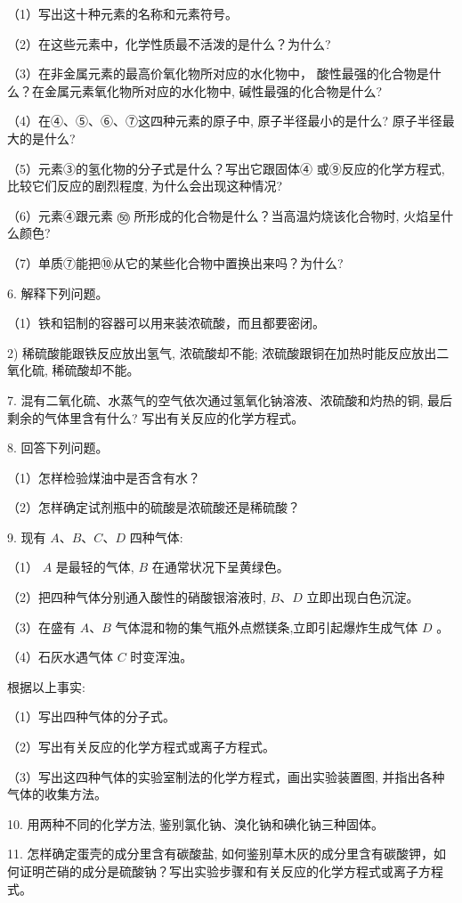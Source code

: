 \documentclass[10pt]{article}
\begin{document}
（1）写出这十种元素的名称和元素符号。

（2）在这些元素中，化学性质最不活泼的是什么？为什么?

（3）在非金属元素的最高价氧化物所对应的水化物中， 酸性最强的化合物是什么？在金属元素氧化物所对应的水化物中, 碱性最强的化合物是什么?

（4）在④、⑤、⑥、⑦这四种元素的原子中, 原子半径最小的是什么? 原子半径最大的是什么?

（5）元素③的氢化物的分子式是什么？写出它跟固体④ 或⑨反应的化学方程式, 比较它们反应的剧烈程度, 为什么会出现这种情况?

（6）元素④跟元素 \(\text{㊿}\) 所形成的化合物是什么？当高温灼烧该化合物时, 火焰呈什么颜色?

（7）单质⑦能把⑩从它的某些化合物中置换出来吗？为什么?

6. 解释下列问题。

（1）铁和铝制的容器可以用来装浓硫酸，而且都要密闭。

2) 稀硫酸能跟铁反应放出氢气, 浓硫酸却不能; 浓硫酸跟铜在加热时能反应放出二氧化硫, 稀硫酸却不能。

7. 混有二氧化硫、水蒸气的空气依次通过氢氧化钠溶液、浓硫酸和灼热的铜, 最后剩余的气体里含有什么? 写出有关反应的化学方程式。

8. 回答下列问题。

（1）怎样检验煤油中是否含有水？

（2）怎样确定试剂瓶中的硫酸是浓硫酸还是稀硫酸？

9. 现有 \(A\text{、}B\text{、}C\text{、}D\) 四种气体:

（1） \(A\) 是最轻的气体, \(B\) 在通常状况下呈黄绿色。

（2）把四种气体分别通入酸性的硝酸银溶液时, \(B\text{、}D\) 立即出现白色沉淀。

（3）在盛有 \(A\text{、}B\) 气体混和物的集气瓶外点燃镁条,立即引起爆炸生成气体 \(D\) 。

（4）石灰水遇气体 \(C\) 时变浑浊。

根据以上事实:

（1）写出四种气体的分子式。

（2）写出有关反应的化学方程式或离子方程式。

（3）写出这四种气体的实验室制法的化学方程式，画出实验装置图, 并指出各种气体的收集方法。

10. 用两种不同的化学方法, 鉴别氯化钠、溴化钠和碘化钠三种固体。

11. 怎样确定蛋壳的成分里含有碳酸盐, 如何鉴别草木灰的成分里含有碳酸钾，如何证明芒硝的成分是硫酸钠？写出实验步骤和有关反应的化学方程式或离子方程式。
\end{document}
